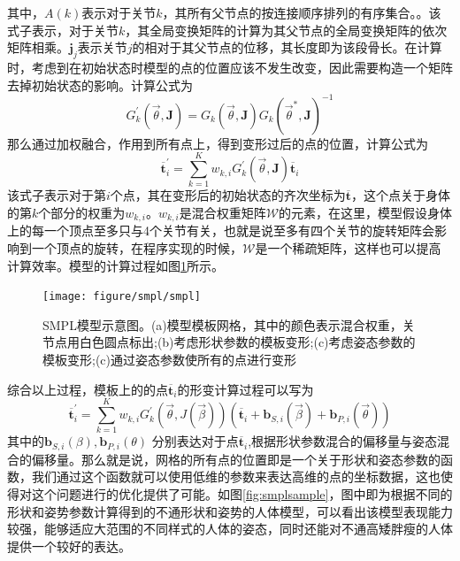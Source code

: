 其中，\(A(k)\)表示对于关节\(k\)，其所有父节点的按连接顺序排列的有序集合。。该式子表示，对于关节\(k\)，其全局变换矩阵的计算为其父节点的全局变换矩阵的依次矩阵相乘。\(\mathbf{j}_j\)表示关节\(j\)的相对于其父节点的位移，其长度即为该段骨长。在计算时，考虑到在初始状态时模型的点的位置应该不发生改变，因此需要构造一个矩阵去掉初始状态的影响。计算公式为
\begin{equation}
    G _ { k } ^ { \prime } ( \vec { \theta } , \mathbf { J } ) = G _ { k } ( \vec { \theta } , \mathbf { J } ) G _ { k } \left( \vec { \theta } ^ { * } , \mathbf { J } \right) ^ { - 1 }
\end{equation}
那么通过加权融合，作用到所有点上，得到变形过后的点的位置，计算公式为
\begin{equation}
    \overline { \mathbf { t } } _ { i } ^ { \prime } = \sum _ { k = 1 } ^ { K } w _ { k , i } G _ { k } ^ { \prime } ( \vec { \theta } , \mathbf { J } ) \overline { \mathbf { t } } _ { i }
\end{equation}
该式子表示对于第\(i\)个点，其在变形后的初始状态的齐次坐标为\(\overline{\mathbf{t}}\)，这个点关于身体的第\(k\)个部分的权重为\(w_{k,i}\)。\(w_{k,i}\)是混合权重矩阵\(\mathcal{W}\)的元素，在这里，模型假设身体上的每一个顶点至多只与4个关节有关，也就是说至多有四个关节的旋转矩阵会影响到一个顶点的旋转，在程序实现的时候，\(\mathcal{W}\)是一个稀疏矩阵，这样也可以提高计算效率。模型的计算过程如图\ref{fig:smpl}所示。
\begin{figure}[htbp]
    \centering
    \texttt{[image: figure/smpl/smpl]}
    \caption{\label{fig:smpl} SMPL模型示意图。(a)模型模板网格，其中的颜色表示混合权重，关节点用白色圆点标出;(b)考虑形状参数的模板变形;(c)考虑姿态参数的模板变形;(c)通过姿态参数使所有的点进行变形}
\end{figure}
综合以上过程，模板上的的点\(\overline { \mathbf { t } } _ { i }\)的形变计算过程可以写为
\begin{equation}
    \overline { \mathbf { t } } _ { i } ^ { \prime } = \sum _ { k = 1 } ^ { K } w _ { k , i } G _ { k } ^ { \prime } ( \vec { \theta } , J ( \vec { \beta } ) ) \left( \overline { \mathbf { t } } _ { i } + \mathbf { b } _ { S , i } ( \vec { \beta } ) + \mathbf { b } _ { P , i } ( \vec { \theta } ) \right)
\end{equation}
其中的\(\mathbf{b}_{S,i}(\beta), \mathbf{b}_{P,i}(\theta)\) 分别表达对于点\(\overline { \mathbf { t } } _ { i }\),根据形状参数混合的偏移量与姿态混合的偏移量。那么就是说，网格的所有点的位置即是一个关于形状和姿态参数的函数，我们通过这个函数就可以使用低维的参数来表达高维的点的坐标数据，这也使得对这个问题进行的优化提供了可能。如图\ref{fig:smplsample}，图中即为根据不同的形状和姿势参数计算得到的不通形状和姿势的人体模型，可以看出该模型表现能力较强，能够适应大范围的不同样式的人体的姿态，同时还能对不通高矮胖瘦的人体提供一个较好的表达。

